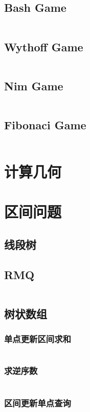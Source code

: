 \documentclass[a4paper,11pt]{article}
\begin{document}
\subsection{Bash Game}
\inputminted[]{c++}{Template/Game/Bash.cpp}
\subsection{Wythoff Game}
\inputminted[]{c++}{Template/Game/Wythoff.cpp}
\subsection{Nim Game}
\inputminted[]{c++}{Template/Game/Nim.cpp}
\subsection{Fibonaci Game}
\inputminted[]{c++}{Template/Game/Fibonaci.cpp}
\section{计算几何}

\section{区间问题}
\subsection{线段树}

\subsection{RMQ}
\inputminted[]{c++}{Template/Segment/RMQ.cpp}
\subsection{树状数组}
\subsubsection{单点更新区间求和}
\inputminted[]{c++}{Template/Segment/TreeArrayI.cpp}
\subsubsection{求逆序数}
\inputminted[]{c++}{Template/Segment/Reverse.cpp}
\subsubsection{区间更新单点查询}
\inputminted[]{c++}{Template/Segment/TreeArrayII.cpp}
\end{document}

